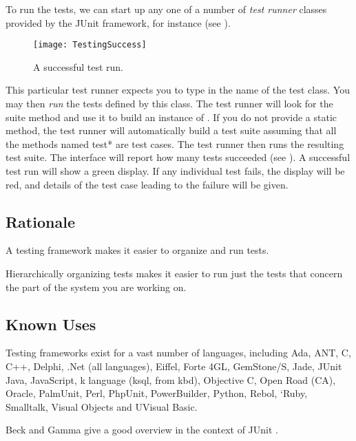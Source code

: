 \documentclass[a4paper,10pt,twoside]{book}
\begin{document}
To run the tests, we can start up any one of a number of \emph{test runner} classes provided by the JUnit framework, for instance  (see ).

\begin{figure}
\begin{center}
\texttt{[image: TestingSuccess]}
\caption{A successful test run.}
\end{center}
\end{figure}

This particular test runner expects you to type in the name of the test class. You may then \emph{run} the tests defined by this class. The test runner will look for the suite method and use it to build an instance of . If you do not provide a static  method, the test runner will automatically build a test suite assuming that all the methods named test* are test cases. The test runner then runs the resulting test suite. The interface will report how many tests succeeded (see ). A successful test run will show a green display. If any individual test fails, the display will be red, and details of the test case leading to the failure will be given.

\subsection*{Rationale}

A testing framework makes it easier to organize and run tests. 

Hierarchically organizing tests makes it easier to run just the tests that concern the part of the system you are working on.

\subsection*{Known Uses}

Testing frameworks exist for a vast number of languages, including Ada, ANT, C, C++, Delphi, .Net (all languages), Eiffel, Forte 4GL, GemStone/S, Jade, JUnit Java, JavaScript, k language (ksql, from kbd), Objective C, Open Road (CA), Oracle, PalmUnit, Perl, PhpUnit, PowerBuilder, Python, Rebol, `Ruby, Smalltalk, Visual Objects and UVisual Basic.

Beck and Gamma give a good overview in the context of JUnit \cite{Beck98a}.

\end{document}
